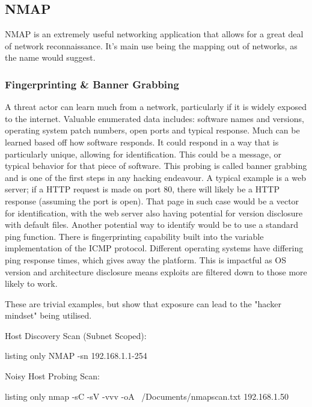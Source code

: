 \subsection{NMAP}
NMAP is an extremely useful networking application that allows for a great deal of network reconnaissance. It's main use being the mapping out of networks, as the name would suggest.

\subsubsection{Fingerprinting \& Banner Grabbing}
A threat actor can learn much from a network, particularly if it is widely exposed to the internet. Valuable enumerated data includes: software names and versions, operating system patch numbers, open ports and typical response.
Much can be learned based off how software responds. It could respond in a way that is particularly unique, allowing for identification. This could be a message, or typical behavior for that piece of software.
This probing is called banner grabbing and is one of the first steps in any hacking endeavour. A typical example is a web server; if a HTTP request is made on port 80, there will likely be a HTTP response (assuming the port is open).
That page in such case would be a vector for identification, with the web server also having potential for version disclosure with default files. Another potential way to identify would be to use a standard ping function. 
There is fingerprinting capability built into the variable implementation of the ICMP protocol. Different operating systems have differing ping response times, which gives away the platform. 
This is impactful as OS version and architecture disclosure means exploits are filtered down to those more likely to work.

These are trivial examples, but show that exposure can lead to the "hacker mindset" being utilised.

Host Discovery Scan (Subnet Scoped):
\begin{tcblisting}{listing only}
    NMAP -sn 192.168.1.1-254
\end{tcblisting}

Noisy Host Probing Scan:
\begin{tcblisting}{listing only}
nmap -sC -sV -vvv -oA  ~/Documents/nmapscan.txt 192.168.1.50
\end{tcblisting}



